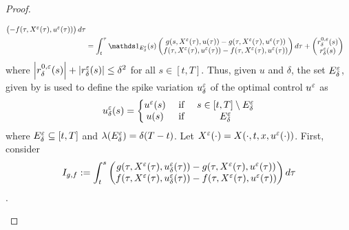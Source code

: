 \begin{proof}
\begin{asparaenum}
\begin{align*}
\begin{pmatrix}
                    - f(\tau, X^{\veps}(\tau), u^{\veps}(\tau)) 
            \end{pmatrix} d\tau \\
            &= \int_{t}^{\tau} \ind_{E_\delta^{\veps}}(s)%
            \begin{pmatrix}
                g(s, X^{\veps}(\tau), u(\tau)) %
                    - g(\tau, X^{\veps}(\tau), u^{\veps}(\tau)) \\
                f(\tau, X^{\veps}(\tau), u^{\veps}(\tau)) %
                    - f(\tau, X^{\veps}(\tau), u^{\veps}(\tau)) 
            \end{pmatrix} d\tau + %
            \begin{pmatrix}
                r_\delta^{0,\veps}(s) \\
                r_\delta^{\veps}(s)
            \end{pmatrix}
        \end{align*}
        where 
        $\left\lvert r_\delta^{0,\varepsilon}(s)\right\rvert  + \left\lvert r_\delta^{\varepsilon}(s)\right\rvert \leq {\delta}^2$ for all $ s \in [t,T]$. Thus, given $u$ and $\delta$, the
        set $E_{\delta}^{\varepsilon}$, given by  is used to define
        the spike variation $u^{\varepsilon}_{\delta}$ of the optimal control
        $u^{\varepsilon}$ as 
        \begin{equation*}
            u^{\veps}_{\delta}(s) = \left\{ %
                \begin{matrix}
                    u^{\veps}(s) & \text{ if } & s \in [t,T]\setminus E^{\veps}_{\delta} \\
                    u(s)  & \text{ if } &  E^{\veps}_{\delta}
                \end{matrix} \right.
        \end{equation*}
        where $E^{\varepsilon}_{\delta} \subseteq [t,T]$ and 
        $\lambda(E^{\varepsilon}_{\delta}) = \delta(T-t)$. Let $X^{\veps}(\cdot) %
        = X(\cdot, t, x, u^{\veps}(\cdot))$. First, consider
        \begin{equation*}
            I_{g,f} := \int_{t}^{s} %
            \begin{pmatrix}
                g(\tau, X^{\veps}(\tau), u_{\delta}^{\veps}(\tau)) - g(\tau, X^{\veps}(\tau), u^{\veps}(\tau)) \\
                f(\tau, X^{\veps}(\tau), u_{\delta}^{\veps}(\tau)) - f(\tau, X^{\veps}(\tau), u^{\veps}(\tau)) 
            \end{pmatrix} d\tau 
        \end{equation*}.
        

\end{asparaenum}
\end{proof}

